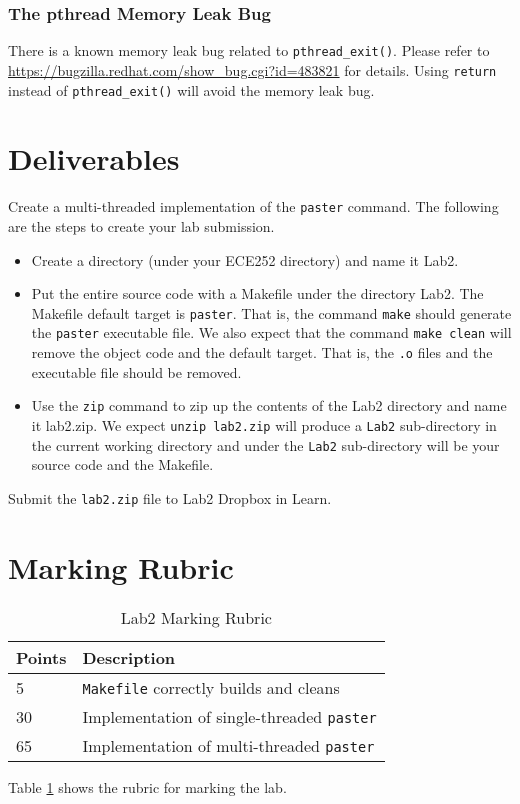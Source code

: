 \subsubsection{The pthread Memory Leak Bug}
\label{sec:pthread-memory-leak}

There is a known memory leak bug related to \verb+pthread_exit()+. Please refer to  \url{https://bugzilla.redhat.com/show_bug.cgi?id=483821} for details. Using \verb+return+ instead of \verb+pthread_exit()+ will avoid the memory leak bug.

\section{Deliverables}

\label{sec:lab2-lab-deliverable}
Create a multi-threaded implementation of the \verb+paster+ command.
The following are the steps to create your lab submission.
\begin{itemize}
\item Create a directory (under your ECE252 directory) and name it Lab2.
\item Put the entire source code with a Makefile under the directory Lab2. The Makefile default target is \verb+paster+. That is, the command \verb+make+ should generate the \verb+paster+ executable file. We also expect that the command \verb+make clean+ will remove the object code and the default target. That is, the \verb+.o+ files and the executable file should be removed.
\item Use the \verb+zip+ command to zip up the contents of the Lab2 directory and name it lab2.zip. We expect \verb+unzip lab2.zip+ will produce a \verb+Lab2+ sub-directory in the current working directory and under the \verb+Lab2+ sub-directory will be your source code and the Makefile.
\end{itemize}
Submit the \verb+lab2.zip+ file to Lab2 Dropbox in Learn.


\section{Marking Rubric}
\begin{table}[ht]
\begin{center}
\begin{tabular}{|p{2cm}|p{9cm}|}
\hline
Points & Description  \\ \hline
5  & \verb+Makefile+ correctly builds and cleans \\ \hline
30 & Implementation of single-threaded \verb+paster+ \\ \hline
65    & Implementation of multi-threaded \verb+paster+ \\ \hline
\end{tabular}
\caption{Lab2 Marking Rubric}
\label{tb_lab2_rubric}
\end{center}
\end{table}

Table \ref{tb_lab2_rubric} shows the rubric for marking the lab.

